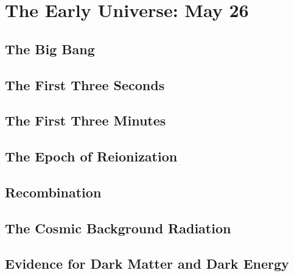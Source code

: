 \section{The Early Universe: May 26}

\subsection{The Big Bang}

\subsection{The First Three Seconds}

\subsection{The First Three Minutes}

\subsection{The Epoch of Reionization}

\subsection{Recombination}

\subsection{The Cosmic Background Radiation}

\subsection{Evidence for Dark Matter and Dark Energy}